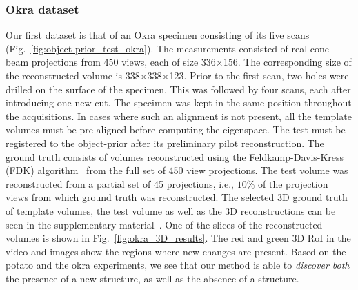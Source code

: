 \documentclass[journal]{IEEEtran}
\begin{document}
\subsubsection{\textbf{Okra dataset}}
\label{Sec:okra_uniform}
Our first dataset is that of an Okra specimen consisting of its five
scans (Fig.~\ref{fig:object-prior_test_okra}). The measurements
consisted of real cone-beam projections from 450 views, each of size
336$\times$156. The corresponding size of the reconstructed volume is
338$\times$338$\times$123. Prior to the first scan, two holes were
drilled on the surface of the specimen. This was followed by four
scans, each after introducing one new cut. The specimen was kept in
the same position throughout the acquisitions. In cases where such an
alignment is not present, all the template volumes must be pre-aligned
before computing the eigenspace. The test must be registered to the
object-prior after its preliminary pilot reconstruction. The ground
truth consists of volumes reconstructed using the Feldkamp-Davis-Kress
(FDK) algorithm~\cite{FDK} from the full set of 450 view
projections. The test volume was reconstructed from a partial set of
45 projections, i.e., $10\%$ of the projection views from which ground
truth was reconstructed. The selected 3D ground truth of template
volumes, the test volume as well as the 3D reconstructions can be seen
in the supplementary material~\cite{supp_paper}. One of the slices of
the reconstructed volumes is shown in
Fig.~\ref{fig:okra_3D_results}. The red and green 3D RoI in the video
and images show the regions where new changes are present. Based on
the potato and the okra experiments, we see that our method is able to
\emph{discover both} the presence of a new structure, as well as the
absence of a structure.
\end{document}
